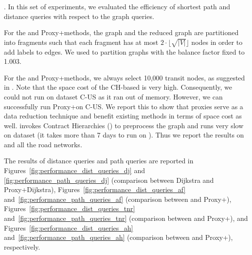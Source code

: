 .
%
In this set of experiments, we evaluated the efficiency of shortest path and distance queries with respect to the graph queries. 

For the \arcflag and Proxy+\arcflag methods, the graph and the reduced graph are partitioned into fragments such that each fragment has at most $2\cdot \lfloor\sqrt{|V|}\rfloor$ nodes in order to add labels to edges. We used \metis to partition graphs with the balance factor fixed to 1.003. 

For the \tnr and Proxy+\tnr methods, we always select 10,000 transit nodes, as suggested in \cite{arz2013transit}. Note that the space cost of the CH-based \tnr is very high. Consequently, we could not run \tnr on dataset C-US as it ran out of memory. However, we can successfully run Proxy+\tnr on C-US. We report this to show that proxies serve as a data reduction technique and benefit existing methods in terms of space cost as well. \tnr invokes Contract Hierarchies (\ch) \cite{GeisbergerSSD08} to preprocess the graph and \ch runs very slow on \dblp dataset (it takes more than 7 days to run \ch on \dblp). Thus we report the results on \dblpone and all the road networks.

The results of distance queries and path queries are reported in Figures~\ref{fig:performance_dist_queries_dj} and \ref{fig:performance_path_queries_dj} (comparison between Dijkstra and Proxy+Dijkstra), Figures~\ref{fig:performance_dist_queries_af} and~\ref{fig:performance_path_queries_af} (comparison between \arcflag and Proxy+\arcflag), Figures~\ref{fig:performance_dist_queries_tnr} and~\ref{fig:performance_path_queries_tnr} (comparison between \tnr and Proxy+\tnr), and Figures~\ref{fig:performance_dist_queries_ah} and~\ref{fig:performance_path_queries_ah} (comparison between \ah and Proxy+\ah), respectively.

